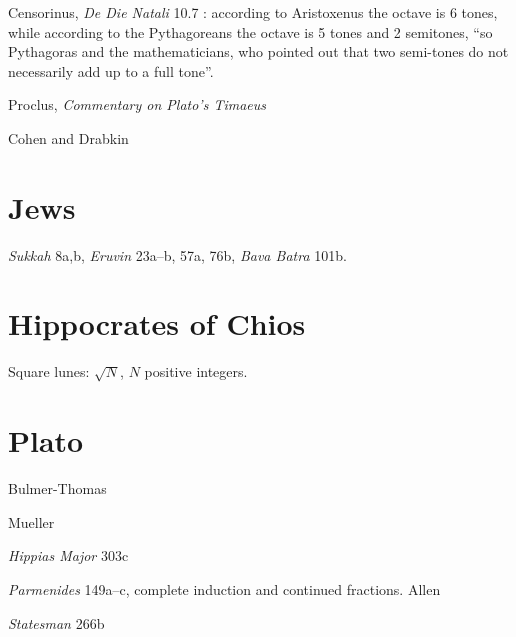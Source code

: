 \documentclass{amsart}
\theoremstyle{definition}
\begin{document}
Censorinus, {\em De Die Natali} 10.7 \cite[p.~18]{censorinus}: according to Aristoxenus the octave is 6 tones, while
according to the Pythagoreans the octave is 5 tones and 2 semitones, ``so Pythagoras and the mathematicians, who pointed
out that two semi-tones do not necessarily add up to a full tone''.


Proclus, {\em Commentary on Plato's Timaeus} \cite{timaeum3II}

Cohen and Drabkin \cite[p.~286]{drabkin}







\section{Jews}
{\em Sukkah} 8a,b, {\em Eruvin} 23a--b, 57a, 76b, {\em Bava Batra} 101b.





\section{Hippocrates of Chios}
Square lunes: $\sqrt{N}$, $N$ positive integers.






\section{Plato}
Bulmer-Thomas \cite{bulmer-thomas}

Mueller \cite{mueller2003}

{\em Hippias Major} 303c

{\em Parmenides} 149a--c, complete induction and continued fractions. Allen \cite[pp.~238--258]{allen}

{\em Statesman} 266b
\end{document}

